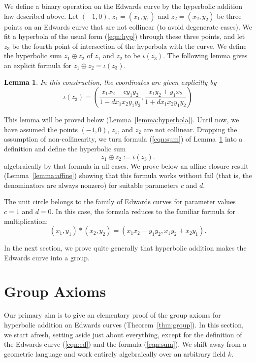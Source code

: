 \documentclass[18pt]{article}
\newtheorem{lemma}[theorem]{Lemma}
\begin{document}
We define a binary operation on the Edwards curve by the hyperbolic addition law described above.
Let $(-1,0)$, $z_1 = (x_1,y_1)$ and $z_2=(x_2,y_2)$ be three points on an Edwards curve
 that are not collinear (to avoid degenerate cases).  We fit a hyperbola of the usual form (\ref{eqn:hyp}) through these three points,
 and let $z_3$ be the fourth point of intersection of the hyperbola with the curve.  We define the hyperbolic sum
 $z_1\oplus z_2$ of $z_1$ and $z_2$ to be $\iota(z_3)$.
 The following lemma gives an explicit formula for $z_1\oplus z_2 = \iota(z_3)$.

 
 \begin{lemma}\label{lemma:hyp} In this construction, the coordinates are given explicitly by
 \begin{equation}\label{eqn:sum}
 \iota(z_3) = \left(\frac{x_1 x_2 - c y_1 y_2}{1 - d x_1 x_2 y_1 y_2},\frac{x_1 y_2 + y_1 x_2}{1+d x_1 x_2 y_1 y_2}\right)
 \end{equation}
 \end{lemma}

This lemma will be proved below (Lemma~\ref{lemma:hyperbola}).
Until now, we have assumed the points $(-1,0)$, $z_1$, and $z_2$ are not collinear.  
Dropping the assumption of non-collinearity, we turn formula (\ref{eqn:sum})
of Lemma~\ref{lemma:hyp} into a definition and define the hyperbolic sum
\[
 z_1\oplus z_2 := \iota(z_3).
\]
algebraically by that formula in all cases.  We prove below an affine
closure result (Lemma~\ref{lemma:affine}) showing that this formula
works without fail (that is, the denominators are always nonzero) for
suitable parameters $c$ and $d$.

The unit circle belongs to the family of Edwards curves for parameter
values $c=1$ and $d=0$.  In this case, the formula reduces to the
familiar formula for multiplication:
\begin{equation}\label{eqn:cx}
(x_1,y_1) * (x_2,y_2) = (x_1 x_2 - y_1 y_2,x_1 y_2 + x_2 y_1).
\end{equation}

In the next section, we prove quite generally that hyperbolic addition
makes the Edwards curve into a group.

\section{Group Axioms}

Our primary aim is to give an elementary proof of the group axioms for
hyperbolic addition on Edwards curves (Theorem~\ref{thm:group}).  In
this section, we start afresh, setting aside just about everything,
except for the definition of the Edwards curve (\ref{eqn:ed}) and
the formula (\ref{eqn:sum}).  We shift away from
a geometric language and work entirely algebraically over an arbitrary
field $k$.
\end{document}
